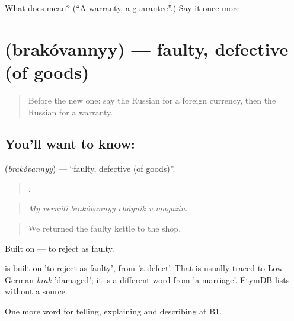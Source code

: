 \begin{tcolorbox}[breakable,colback=teal!4,colframe=teal!35!black,title={Before you move on}]
What does  mean? (\textquotedblleft{}A warranty, a guarantee\textquotedblright{}.) Say it once more.
\end{tcolorbox}
\section[\texorpdfstring{\ru{бракованный} (brakóvannyy)}{бракованный (brakóvannyy)}]{ (brakóvannyy) — faulty, defective (of goods)}

\label{lesson:RU-C456-brakovannyy}



\begin{quote}
Before the new one: say the Russian for a foreign currency, then the Russian for a warranty.
\end{quote}

\subsection*{You'll want to know: }
\textbf{} (\emph{brakóvannyy}) — \textquotedblleft{}faulty, defective (of goods)\textquotedblright{}.

\begin{quote}
     .
\end{quote}

\begin{quote}
\emph{My vernúli brakóvannyy cháynik v magazín.}
\end{quote}

\begin{quote}
We returned the faulty kettle to the shop.
\end{quote}

Built on \emph{} — to reject as faulty.

\begin{cousinweb}
\emph{} is built on \emph{} 'to reject as faulty', from \emph{} 'a defect'. That \emph{} is usually traced to Low German \emph{brak} 'damaged'; it is a different word from \emph{} 'a marriage'. EtymDB lists \emph{} without a source.
\end{cousinweb}

\begin{grammarlens}[title={What you've built}]
One more word for telling, explaining and describing at B1.
\end{grammarlens}

